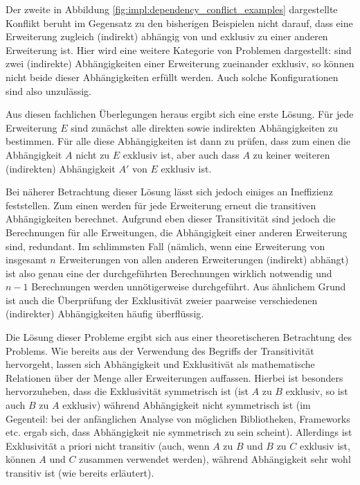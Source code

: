 Der zweite in Abbildung \ref{fig:impl:dependency_conflict_examples} dargestellte Konflikt beruht im Gegensatz zu den bisherigen Beispielen nicht darauf, dass eine Erweiterung zugleich (indirekt) abhängig von und exklusiv zu einer anderen Erweiterung ist. Hier wird eine weitere Kategorie von Problemen dargestellt: sind zwei (indirekte) Abhängigkeiten einer Erweiterung zueinander exklusiv, so können nicht beide dieser Abhängigkeiten erfüllt werden. Auch solche Konfigurationen sind also unzulässig.

Aus diesen fachlichen Überlegungen heraus ergibt sich eine erste Lösung. Für jede Erweiterung $E$ sind zunächst alle direkten sowie indirekten Abhängigkeiten zu bestimmen. Für alle diese Abhängigkeiten ist dann zu prüfen, dass zum einen die Abhängigkeit $A$ nicht zu $E$ exklusiv ist, aber auch dass $A$ zu keiner weiteren (indirekten) Abhängigkeit $A'$ von $E$ exklusiv ist.

Bei näherer Betrachtung dieser Lösung lässt sich jedoch einiges an Ineffizienz feststellen. Zum einen werden für jede Erweiterung erneut die transitiven Abhängigkeiten berechnet. Aufgrund eben dieser Transitivität sind jedoch die Berechnungen für alle Erweitungen, die Abhängigkeit einer anderen Erweiterung sind, redundant. Im schlimmsten Fall (nämlich, wenn eine Erweiterung von insgesamt $n$ Erweiterungen von allen anderen Erweiterungen (indirekt) abhängt) ist also genau eine der durchgeführten Berechnungen wirklich notwendig und $n - 1$ Berechnungen werden unnötigerweise durchgeführt. Aus ähnlichem Grund ist auch die Überprüfung der Exklusitivät zweier paarweise verschiedenen (indirekter) Abhängigkeiten häufig überflüssig.

Die Lösung dieser Probleme ergibt sich aus einer theoretischeren Betrachtung des Problems. Wie bereits aus der Verwendung des Begriffs der Transitivität hervorgeht, lassen sich Abhängigkeit und Exklusitivät als mathematische Relationen über der Menge aller Erweiterungen auffassen. Hierbei ist besonders hervorzuheben, dass die Exklusivität symmetrisch ist (ist $A$ zu $B$ exklusiv, so ist auch $B$ zu $A$ exklusiv) während Abhängigkeit nicht symmetrisch ist (im Gegenteil: bei der anfänglichen Analyse von möglichen Bibliotheken, Frameworks etc. ergab sich, dass Abhängigkeit nie symmetrisch zu sein scheint). Allerdings ist Exklusivität a priori nicht transitiv (auch, wenn $A$ zu $B$ und $B$ zu $C$ exklusiv ist, können $A$ und $C$ zusammen verwendet werden), während Abhängigkeit sehr wohl transitiv ist (wie bereits erläutert).

